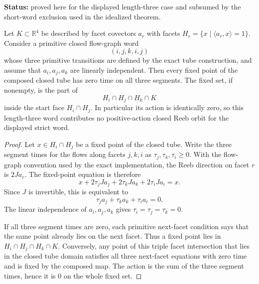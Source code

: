 \begin{unverified}
\begin{lemma}%
\label{lem:fg-length-three-zero-time}
\textbf{Status:} proved here for the displayed length-three case and subsumed
by the short-word exclusion used in the idealized theorem.

Let \(K\subset \mathbb{R}^4\) be described by facet covectors
\(a_r\) with facets \(H_r=\{x\mid \langle a_r,x\rangle=1\}\).
Consider a primitive closed flow-graph word
\[
  (i,j,k,i,j)
\]
whose three primitive transitions are defined by the exact tube
construction, and assume that \(a_i,a_j,a_k\) are linearly independent.
Then every fixed point of the composed closed tube has zero time on all
three segments.  The fixed set, if nonempty, is the part of
\[
  H_i\cap H_j\cap H_k\cap K
\]
inside the start face \(H_i\cap H_j\).  In particular its action is
identically zero, so this length-three word contributes no positive-action
closed Reeb orbit for the displayed strict word.

\begin{proof}
Let \(x\in H_i\cap H_j\) be a fixed point of the closed tube.  Write the
three segment times for the flows along facets \(j,k,i\) as
\(\tau_j,\tau_k,\tau_i\geq 0\).  With the flow-graph convention used by the
exact implementation, the Reeb direction on facet \(r\) is \(2Ja_r\).  The
fixed-point equation is therefore
\[
  x+2\tau_jJa_j+2\tau_kJa_k+2\tau_iJa_i=x .
\]
Since \(J\) is invertible, this is equivalent to
\[
  \tau_j a_j+\tau_k a_k+\tau_i a_i=0 .
\]
The linear independence of \(a_i,a_j,a_k\) gives
\(\tau_i=\tau_j=\tau_k=0\).

If all three segment times are zero, each primitive next-facet condition says
that the same point already lies on the next facet.  Thus a fixed point lies
in \(H_i\cap H_j\cap H_k\cap K\).  Conversely, any point of this triple
facet intersection that lies in the closed tube domain satisfies all three
next-facet equations with zero time and is fixed by the composed map.  The
action is the sum of the three segment times, hence it is \(0\) on the whole
fixed set.
\end{proof}
\end{lemma}
\end{unverified}

